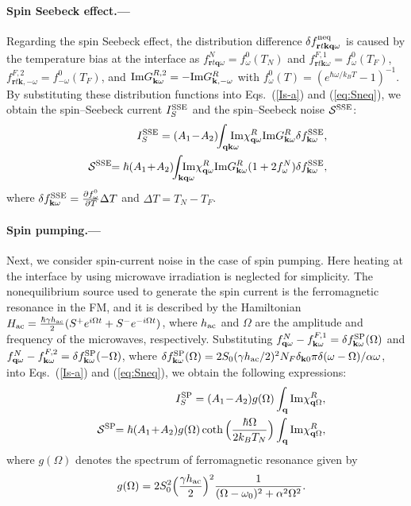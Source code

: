 \documentclass[aps,prl,reprint,showpacs]{revtex4-1}
\def\v#1{\mathbf{#1}}
\def\vq{\v{q}} 					%
\def\vk{\v{k}} 					%
\def\r{\v{r}} 					%
\def\q{\v{q}} 					%
\def\k{\v{k}} 					%
\def\del{\partial}
\def\IM{{\rm Im}} %
\def\ikqom{\int_{\vq\vk\omega}} %
\begin{document}
\paragraph{Spin Seebeck effect.---}
Regarding the spin Seebeck effect, the distribution difference
$\delta f^{{\rm neq}}_{\r t\k\q\omega}$
is caused by the temperature bias at the interface as $f^N_{\r t\q\omega} =f^0_\omega(T_N)$ and $f^{F,1}_{\r t\k\omega} =f^0_\omega(T_F)$, $f^{F,2}_{\r t\k,-\omega} =f^0_{-\omega}(T_F)$, and $\IM G^{R,2}_{\k\omega} = - \IM G^{R}_{\k,-\omega}$ with $f^0_\omega(T)= (e^{\hbar \omega/k_B T}-1)^{-1}$. 
By substituting these distribution functions into Eqs.~(\ref{Is-a}) and (\ref{eq:Sneq}),  
we obtain the spin--Seebeck current $I_S^{\rm SSE}$ and the spin--Seebeck noise $\mathcal{S}^{\rm SSE}$:
\begin{eqnarray}
& &  \!\!\!\!  I_S^{\rm SSE}
=
  (A_1\! -\! A_2) \!\! \ikqom \!\!\!\!\!\! \IM \chi^{R}_{\q\omega} \IM G^{R}_{\k\omega} \delta f^{\rm SSE}_{\k \omega} , \label{IsSSE} \\
& & \!\!\!\! \mathcal{S}^{\rm SSE}\!\!=\hbar ( A_1\! +\! A_2) \!\!\int_{\k\q\omega} \!\!\!\!\!\!\!\! \IM \chi^{R}_{\q\omega} \IM G^{R}_{\k\omega} (1+2f^N_\omega) \delta f^{\rm SSE}_{\k \omega} , \label{eq:SneqSSE}
\end{eqnarray}
where $\delta f^{\rm SSE}_{\k \omega} = \frac{\del f^0_\omega}{\del T} \Delta T$ and $\Delta T = T_N -T_F$. 

\paragraph{Spin pumping.---}
Next, we consider spin-current noise in the case of spin pumping. 
Here heating at the interface by using microwave irradiation is neglected for simplicity. 
The nonequilibrium source used to generate the spin current is the ferromagnetic resonance in the FM, and it is described by the Hamiltonian $H_{\rm ac} = \frac{\hbar \gamma h_{\rm ac}}{2}(S^+ e^{i\Omega t} + S^- e^{-i\Omega t})$, where $h_{\rm ac}$ and $\Omega$ are the amplitude and frequency of the microwaves, respectively.
Substituting 
$f^{N}_{\q\omega}-f^{F,1}_{\k\omega} = \delta f^{\rm SP}_{\k\omega}(\Omega)$ and 
$f^{N}_{\q\omega}-f^{F,2}_{\k\omega} = \delta f^{\rm SP}_{\k\omega}(-\Omega)$, 
where $\delta f^{\rm SP}_{\k\omega} (\Omega)= 2S_0(\gamma h_{\rm ac}/2)^2N_F\delta_{\k 0} \pi \delta (\omega -\Omega)/\alpha \omega$, 
into Eqs.~(\ref{Is-a}) and (\ref{eq:Sneq}), we obtain the following expressions:  
\begin{eqnarray}
&& I_S^{\rm SP} = (A_1 \! - \! A_2) g(\Omega) \int_{\q} \IM \chi^R_{\q \Omega}, \label{eq:IsSP} \\
&& \mathcal{S}^{\rm SP}\!\!= \hbar (A_1 \! + \! A_2) g(\Omega) \coth\Big(\frac{\hbar \Omega}{2k_B T_N} \Big)
\int_{\q} \IM \chi^R_{\q \Omega}, \label{eq:SneqSP}
\end{eqnarray}
where $g(\Omega)$ denotes the spectrum of ferromagnetic resonance given by
\begin{eqnarray}
&& g(\Omega) = 2S_0^2 \Big( \frac{\gamma h_{\rm ac}}{2} \Big)^2 \frac{1}{(\Omega -\omega_0)^2 + \alpha^2 \Omega^2}.
\end{eqnarray}
\end{document}
